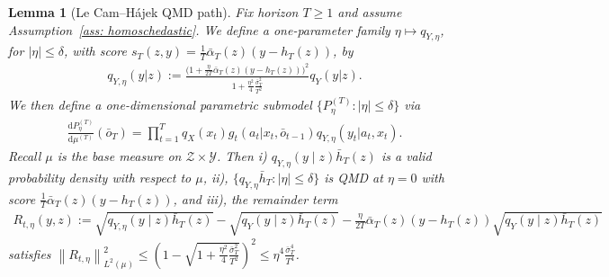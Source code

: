 \documentclass[10pt,a4paper]{amsart}
\newtheorem{lem}{Lemma}
\begin{document}
\begin{lem}[Le Cam--H{\'a}jek QMD path]\label{lem:lch_qmd}
Fix horizon $T\geq 1$ and assume Assumption~\ref{ass: homoschedastic}. We define a one-parameter family $\eta \mapsto q_{Y, \eta}$, for $|\eta|\leq \delta$, with score $s_{T}(z, y) = \frac{1}{T}\bar{\alpha}_T(z)(y - h_T(z))$, by 
\begin{align}
    q_{Y, \eta}(y|z):= \frac{\big(1 + \frac{\eta}{2T}\bar{\alpha}_T(z)(y - h_T(z))\big)^2}{1 + \frac{\eta^2}{4}\frac{\bar{\sigma}_T^2}{T^2}}q_{Y}(y|z).\label{eq: q_Y_eta_def}
\end{align}We then define a one-dimensional parametric submodel $\{P^{(T)}_\eta:|\eta|\le\delta\}$ via
\begin{align*}
    \frac{\mathrm{d} P^{(T)}_{\eta}}{\mathrm{d}\mu^{(T)}}(\bar{o}_T) = \prod_{t=1}^{T}q_X(x_t)g_t(a_t|x_t, \bar{o}_{t-1})q_{Y, \eta}(y_t|a_t,x_t).
\end{align*}
Recall $\mu$ is the base measure on $\mathcal{Z}\times \mathcal{Y}$. Then i) $q_{Y,\eta}(y\mid z)\bar{h}_T(z)$ is a valid probability density with respect to $\mu$, ii), $\{q_{Y,\eta}\bar{h}_T: |\eta|\leq \delta\}$ is QMD at $\eta = 0$ with score $\frac{1}{T}\bar{\alpha}_T(z)(y - h_T(z))$, and iii), the remainder term
\begin{align*}
    R_{t,\eta}(y,z):= \sqrt{q_{Y,\eta}(y\mid z)\bar{h}_T(z)} - \sqrt{q_Y(y\mid z)\bar{h}_T(z)} - \frac{\eta}{2T}\bar{\alpha}_T(z)(y - h_T(z))\sqrt{q_{Y}(y\mid z)\bar{h}_T(z)}
\end{align*}
satisfies $\left\|R_{t,\eta}\right\|_{L^2(\mu)}^2 \leq \left(1 - \sqrt{1 + \frac{\eta^2}{4}\frac{\bar{\sigma}_T^2}{T^2}}\right)^2 \leq \eta^4 \frac{\bar{\sigma}_T^4}{T^4}$. 
\end{lem}
\end{document}
